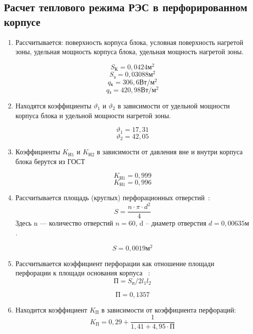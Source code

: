 \subsection{Расчет теплового режима РЭС в перфорированном корпусе}

\begin{enumerate}[label={\arabic*.}]

\item Рассчитывается:
  поверхность корпуса блока,
  условная поверхность нагретой зоны,
  удельная мощность корпуса блока,
  удельная мощность нагретой зоны.

  $$S\mathrm{_{К}}=0,0424\mathrm{м^2}$$
  $$S\mathrm{_{з}} = 0,03088 \mathrm{м^2}$$
  $$q\mathrm{_к} = 306,6\mathrm{Вт/м^2}$$
  $$q\mathrm{_з} = 420,98 \mathrm{ Вт/м^2}$$

\item Находятся коэффициенты $\vartheta_1$ и
  $\vartheta_2$ в зависимости от
  удельной мощности корпуса блока и
  удельной мощности нагретой зоны.

  $$\vartheta_1=17,31$$
  $$\vartheta_2=42,05$$


\item Коэффициенты $K\mathrm{_{Н1}}$ и $K\mathrm{_{Н2}}$
  в зависимости от давления вне и
  внутри корпуса блока берутся из ГОСТ

  $$K\mathrm{_{Н1}} = 0,999$$
  $$K\mathrm{_{Н1}} = 0,996$$

\item Рассчитывается площадь (круглых)
  перфорационных отверстий~\cite{Rotkop1976}:
  \begin{equation}
    S = \frac{n \cdot \pi \cdot d^2}{4}
    \end{equation}
    Здесь n — количество отверстий $n = 60$,
    d – диаметр отверстия $d = 0,00635\mathrm{м}$.

    $$S = 0,0019\mathrm{м^2}$$

\item Рассчитывается коэффициент перфорации
    как отношение площади перфорации к
    площади основания корпуса ~\cite{Rotkop1976}:
    \begin{equation}
    \mathrm{П} = S\mathrm{_п}/2 l_1 l_2
  \end{equation}

  $$\mathrm{П} = 0,1357$$

\item Находится коэффициент $K\mathrm{_П}$ в зависимости от
  коэффициента перфораций:
  \begin{equation}
    K\mathrm{_П} = 0,29 + \frac{1}{1,41 + 4,95 \cdot \mathrm{П}}
  \end{equation}
 

\end{enumerate}
